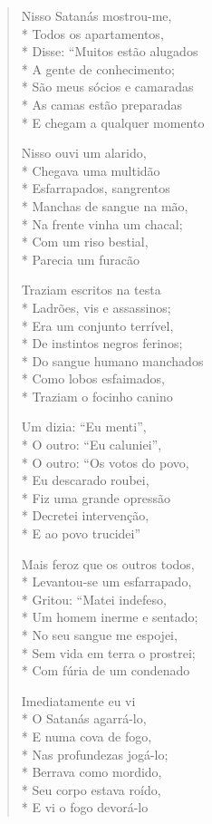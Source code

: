 \begin{verse}
Nisso Satanás mostrou-me,\\*
Todos os apartamentos,\\*
Disse: ``Muitos estão alugados\\*
A gente de conhecimento;\\*
São meus sócios e camaradas\\*
As camas estão preparadas\\*
E chegam a qualquer momento

Nisso ouvi um alarido,\\*
Chegava uma multidão\\*
Esfarrapados, sangrentos\\*
Manchas de sangue na mão,\\*
Na frente vinha um chacal;\\*
Com um riso bestial,\\*
Parecia um furacão

Traziam escritos na testa\\*
Ladrões, vis e assassinos;\\*
Era um conjunto terrível,\\*
De instintos negros ferinos;\\*
Do sangue humano manchados\\*
Como lobos esfaimados,\\*
Traziam o focinho canino

Um dizia: ``Eu menti'',\\*
O outro: ``Eu caluniei'',\\*
O outro: ``Os votos do povo,\\*
Eu descarado roubei,\\*
Fiz uma grande opressão\\*
Decretei intervenção,\\*
E ao povo trucidei''

Mais feroz que os outros todos,\\*
Levantou-se um esfarrapado,\\*
Gritou: ``Matei indefeso,\\*
Um homem inerme e sentado;\\*
No seu sangue me espojei,\\*
Sem vida em terra o prostrei;\\*
Com fúria de um condenado

Imediatamente eu vi\\*
O Satanás agarrá-lo,\\*
E numa cova de fogo,\\*
Nas profundezas jogá-lo;\\*
Berrava como mordido,\\*
Seu corpo estava roído,\\*
E vi o fogo devorá-lo


\end{verse}
